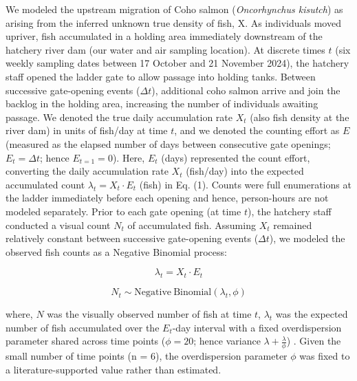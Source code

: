 \documentclass{article}
\begin{document}
We modeled the upstream migration of Coho salmon (\textit{Oncorhynchus kisutch}) as arising from the inferred unknown true density of fish, X. As individuals moved upriver, fish accumulated in a holding area immediately downstream of the hatchery river dam (our water and air sampling location). At discrete times $t$ (six weekly sampling dates between 17 October and 21 November 2024), the hatchery staff opened the ladder gate to allow passage into holding tanks. Between successive gate-opening events ($\Delta t$), additional coho salmon arrive and join the backlog in the holding area, increasing the number of individuals awaiting passage. We denoted the true daily accumulation rate $X_t$ (also fish density at the river dam) in units of fish/day at time $t$, and we denoted the counting effort as $E$ (measured as the elapsed number of days between consecutive gate openings; $E_t =\Delta t$; hence $ E_{t=1} = 0$). Here, $E_t$ (days) represented the count effort, converting the daily accumulation rate $X_t$ (fish/day) into the expected accumulated count $\lambda_t=X_t\cdot E_t$ (fish) in Eq. (1). Counts were full enumerations at the ladder immediately before each opening and hence, person-hours are not modeled separately. Prior to each gate opening (at time $t$), the hatchery staff conducted a visual count $N_t$ of accumulated fish. Assuming $X_t$ remained relatively constant between successive gate-opening events ($\Delta t$), we modeled the observed fish counts as a Negative Binomial process:

\begin{equation}
\lambda_t = X_t \cdot E_t
\end{equation}

\begin{equation}
N_t \sim \mathrm{Negative\ Binomial}(\lambda_t, \phi)
\end{equation} 

where, $N$ was the visually observed number of fish at time $t$,  $\lambda_t$ was the expected number of fish accumulated over the $E_t$-day interval with a fixed overdispersion parameter shared across time points ($\phi =20$; hence variance $\lambda+\frac{\lambda}{\phi}$) \cite{welch1993, guri2024a}. Given the small number of time points (n = 6), the overdispersion parameter $\phi$ was fixed to a literature-supported value rather than estimated.
\end{document}

